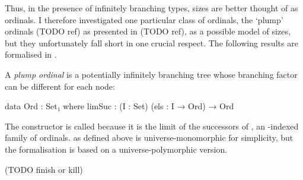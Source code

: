 Thus, in the presence of infinitely branching types, sizes are better thought of
as ordinals. I therefore investigated one particular class of ordinals, the
\enquote*{plump} ordinals (TODO ref) as presented in (TODO ref), as a possible model of
sizes, but they unfortunately fall short in one crucial respect. The following
results are formalised in .

A \emph{plump ordinal} is a potentially infinitely branching tree whose
branching factor can be different for each node:
\begin{code}
data Ord : Set₁ where
  limSuc : (I : Set) (els : I → Ord) → Ord
\end{code}
The constructor is called  because it is the limit of the
successors of , an -indexed family of ordinals. 
as defined above is universe-monomorphic for simplicity, but the formalisation
is based on a universe-polymorphic version.

(TODO finish or kill)